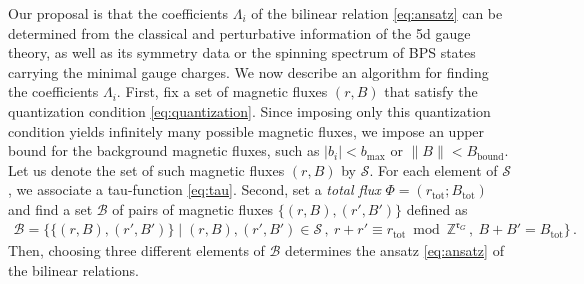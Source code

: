 \documentclass[11pt, a4paper]{article}
\theoremstyle{definition}
\begin{document}
Our proposal is that the coefficients $ \Lambda_i $ of the bilinear relation \eqref{eq:ansatz} can be determined from the classical and perturbative information of the 5d gauge theory, as well as its symmetry data or the spinning spectrum of BPS states carrying the minimal gauge charges. We now describe an algorithm for finding the coefficients $ \Lambda_i $. First, fix a set of magnetic fluxes $ (r,B) $ that satisfy the quantization condition \eqref{eq:quantization}. Since imposing only this quantization condition yields infinitely many possible magnetic fluxes, we impose an upper bound for the background magnetic fluxes, such as $ |b_i| < b_{\mathrm{max}} $ or $ \lVert B \rVert < B_{\mathrm{bound}} $. Let us denote the set of such magnetic fluxes $ (r,B) $ by $ \mathcal{S} $. For each element of $ \mathcal{S} $, we associate a tau-function \eqref{eq:tau}. Second, set a \emph{total flux} $ \Phi = (r_{\mathrm{tot}}; B_{\mathrm{tot}}) $ and find a set $ \mathcal{B} $ of pairs of magnetic fluxes $ \{(r,B),(r',B')\} $ defined as
\begin{align}
    \mathcal{B} = \big\{
        \{(r,B),(r',B')\} \mid
        (r,B), (r',B') \in \mathcal{S} \, , \
        r+r' \equiv r_{\mathrm{tot}} \bmod{\mathbb{Z}^{\mathfrak{r}_G}} \, , \
        B+B' = B_{\mathrm{tot}}
    \big\} \, .
\end{align}
Then, choosing three different elements of $ \mathcal{B} $ determines the ansatz \eqref{eq:ansatz} of the bilinear relations.
\end{document}
